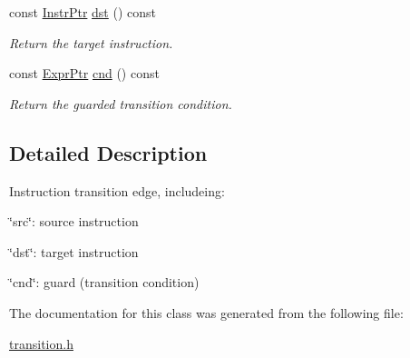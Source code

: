 \begin{DoxyCompactItemize}
const \mbox{\hyperlink{namespaceilang_af88a19312ae653d687a0d1207bb284f6}{Instr\+Ptr}} \mbox{\hyperlink{classilang_1_1_instr_tran_edge_a5d2048dcd17f66e21ae7fc73347402fe}{dst}} () const
\begin{DoxyCompactList}\small\item\em Return the target instruction. \end{DoxyCompactList}\item 
\mbox{\label{classilang_1_1_instr_tran_edge_ab6637ebd4055b22e3146a40bdaea2fdd}} 
const \mbox{\hyperlink{namespaceilang_a7c4196c72e53ea4df4b7861af7bc3bce}{Expr\+Ptr}} \mbox{\hyperlink{classilang_1_1_instr_tran_edge_ab6637ebd4055b22e3146a40bdaea2fdd}{cnd}} () const
\begin{DoxyCompactList}\small\item\em Return the guarded transition condition. \end{DoxyCompactList}\end{DoxyCompactItemize}


\subsection{Detailed Description}
Instruction transition edge, includeing\+: 


\begin{DoxyItemize}
\item \char`\"{}src\char`\"{}\+: source instruction
\item \char`\"{}dst\char`\"{}\+: target instruction
\item \char`\"{}cnd\char`\"{}\+: guard (transition condition) 
\end{DoxyItemize}

The documentation for this class was generated from the following file\+:\begin{DoxyCompactItemize}
\item 
\mbox{\hyperlink{transition_8h}{transition.\+h}}\end{DoxyCompactItemize}
